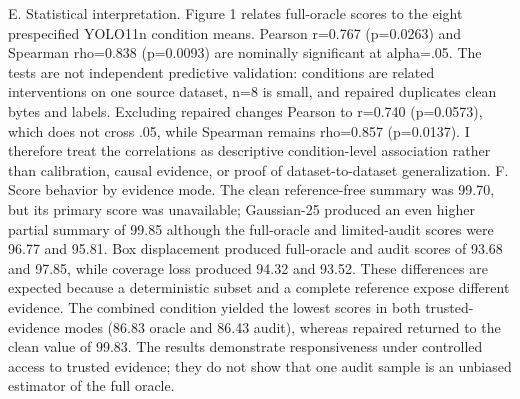 \documentclass[conference]{IEEEtran}
\begin{document}
E. Statistical interpretation. Figure 1 relates full-oracle scores to the eight prespecified YOLO11n condition means. Pearson r=0.767 (p=0.0263) and Spearman rho=0.838 (p=0.0093) are nominally significant at alpha=.05. The tests are not independent predictive validation: conditions are related interventions on one source dataset, n=8 is small, and repaired duplicates clean bytes and labels. Excluding repaired changes Pearson to r=0.740 (p=0.0573), which does not cross .05, while Spearman remains rho=0.857 (p=0.0137). I therefore treat the correlations as descriptive condition-level association rather than calibration, causal evidence, or proof of dataset-to-dataset generalization.
F. Score behavior by evidence mode. The clean reference-free summary was 99.70, but its primary score was unavailable; Gaussian-25 produced an even higher partial summary of 99.85 although the full-oracle and limited-audit scores were 96.77 and 95.81. Box displacement produced full-oracle and audit scores of 93.68 and 97.85, while coverage loss produced 94.32 and 93.52. These differences are expected because a deterministic subset and a complete reference expose different evidence. The combined condition yielded the lowest scores in both trusted-evidence modes (86.83 oracle and 86.43 audit), whereas repaired returned to the clean value of 99.83. The results demonstrate responsiveness under controlled access to trusted evidence; they do not show that one audit sample is an unbiased estimator of the full oracle.
\end{document}
